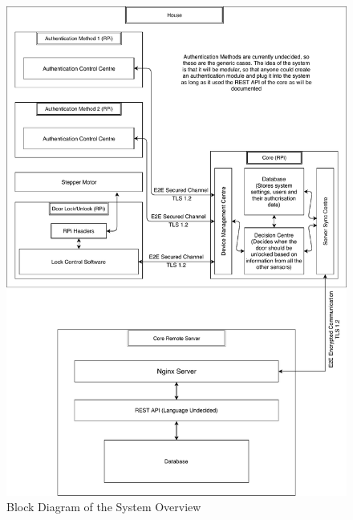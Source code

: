 \begin{figure}[H]
	\caption{Block Diagram of the System Overview}
	\centering
		\includegraphics[height=0.6\textheight,keepaspectratio]{Graphics/FYP-Block-Diagram-Portrait}
\end{figure}

